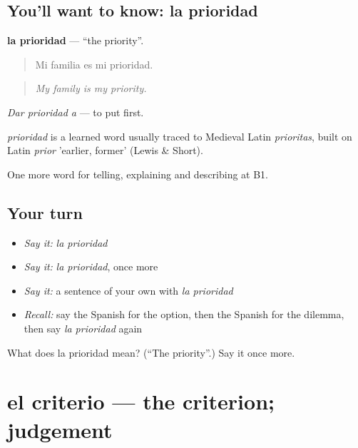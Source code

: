\subsection*{You'll want to know: la prioridad}
\textbf{la prioridad} — \textquotedblleft{}the priority\textquotedblright{}.

\begin{quote}
Mi familia es mi prioridad.
\end{quote}

\begin{quote}
\emph{My family is my priority.}
\end{quote}

\emph{Dar prioridad a} — to put first.

\begin{cousinweb}
\emph{prioridad} is a learned word usually traced to Medieval Latin \emph{prioritas}, built on Latin \emph{prior} 'earlier, former' (Lewis \& Short).
\end{cousinweb}

\begin{grammarlens}[title={What you've built}]
One more word for telling, explaining and describing at B1.
\end{grammarlens}

\subsection*{Your turn}
\begin{itemize}
\raggedright
  \item \emph{Say it:} \emph{la prioridad}
  \item \emph{Say it:} \emph{la prioridad}, once more
  \item \emph{Say it:} a sentence of your own with \emph{la prioridad}
  \item \emph{Recall:} say the Spanish for the option, then the Spanish for the dilemma, then say \emph{la prioridad} again
\end{itemize}

\begin{tcolorbox}[breakable,colback=teal!4,colframe=teal!35!black,title={Before you move on}]
What does la prioridad mean? (\textquotedblleft{}The priority\textquotedblright{}.) Say it once more.
\end{tcolorbox}
\section[el criterio]{el criterio — the criterion; judgement}


